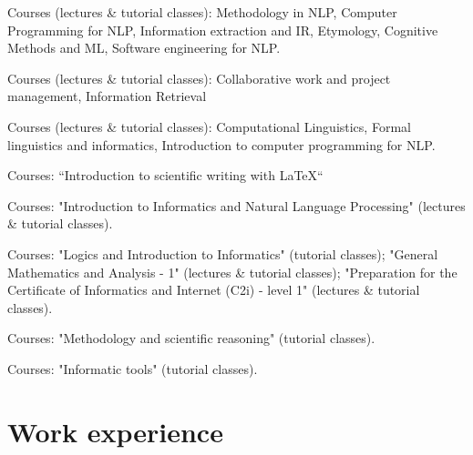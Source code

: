 \documentclass[11pt,a4paper,roman]{moderncv}
\begin{document}
{Courses (lectures \& tutorial classes): Methodology in NLP, Computer Programming for NLP, Information extraction and IR, Etymology, Cognitive Methods and ML, Software engineering for NLP.}

{Courses (lectures \& tutorial classes): Collaborative work and project management, Information Retrieval}

{Courses (lectures \& tutorial classes): Computational Linguistics, Formal linguistics and informatics, Introduction to computer programming for NLP.}

{Courses: “Introduction to scientific writing with \LaTeX{}“}

{Courses: "Introduction to Informatics and Natural Language Processing" (lectures \& tutorial classes).}

{Courses: "Logics and Introduction to Informatics" (tutorial classes); "General Mathematics and Analysis - 1" (lectures \& tutorial classes); "Preparation for the Certificate of Informatics and Internet (C2i) - level 1" (lectures \& tutorial classes).}

{Courses: "Methodology and scientific reasoning" (tutorial classes).}

{Courses: "Informatic tools" (tutorial classes).}





\section{Work experience}
\end{document}
